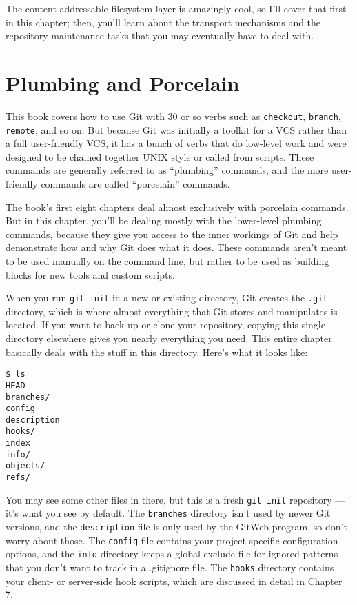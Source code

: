 \documentclass[a4paper]{book}
\newcommand{\prechap}{Chapter }
\newcommand{\postchap}{}
\newcommand{\chapref}[1]{\hyperref[chap:#1]{\prechap #1\postchap}}
\begin{document}
The content-addressable filesystem layer is amazingly cool, so I'll cover that first in this chapter; then, you'll learn about the transport mechanisms and the repository maintenance tasks that you may eventually have to deal with.

\section{Plumbing and Porcelain}\label{plumbing-and-porcelain}

This book covers how to use Git with 30 or so verbs such as \texttt{checkout}, \texttt{branch}, \texttt{remote}, and so on. But because Git was initially a toolkit for a VCS rather than a full user-friendly VCS, it has a bunch of verbs that do low-level work and were designed to be chained together UNIX style or called from scripts. These commands are generally referred to as “plumbing” commands, and the more user-friendly commands are called “porcelain” commands.

The book's first eight chapters deal almost exclusively with porcelain commands. But in this chapter, you'll be dealing mostly with the lower-level plumbing commands, because they give you access to the inner workings of Git and help demonstrate how and why Git does what it does. These commands aren't meant to be used manually on the command line, but rather to be used as building blocks for new tools and custom scripts.

When you run \texttt{git init} in a new or existing directory, Git creates the \texttt{.git} directory, which is where almost everything that Git stores and manipulates is located. If you want to back up or clone your repository, copying this single directory elsewhere gives you nearly everything you need. This entire chapter basically deals with the stuff in this directory. Here's what it looks like:

\begin{shaded}\begin{verbatim}
$ ls
HEAD
branches/
config
description
hooks/
index
info/
objects/
refs/
\end{verbatim}\end{shaded}

You may see some other files in there, but this is a fresh \texttt{git init} repository --- it's what you see by default. The \texttt{branches} directory isn't used by newer Git versions, and the \texttt{description} file is only used by the GitWeb program, so don't worry about those. The \texttt{config} file contains your project-specific configuration options, and the \texttt{info} directory keeps a global exclude file for ignored patterns that you don't want to track in a .gitignore file. The \texttt{hooks} directory contains your client- or server-side hook scripts, which are discussed in detail in \chapref{7}.
\end{document}
